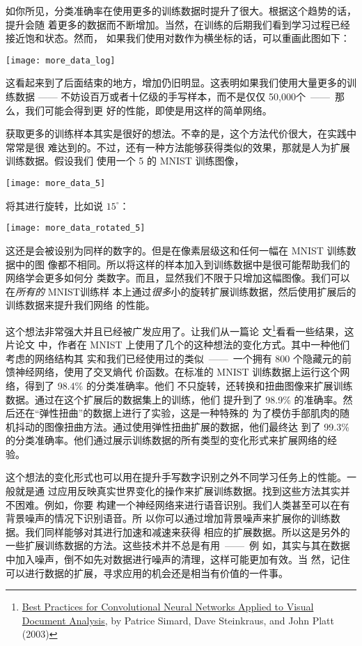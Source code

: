 如你所见，分类准确率在使用更多的训练数据时提升了很大。根据这个趋势的话，提升会随
着更多的数据而不断增加。当然，在训练的后期我们看到学习过程已经接近饱和状态。然而，
如果我们使用对数作为横坐标的话，可以重画此图如下：
\begin{center}
\texttt{[image: more\_data\_log]}
\end{center}

这看起来到了后面结束的地方，增加仍旧明显。这表明如果我们使用大量更多的训练数据
—— 不妨设百万或者十亿级的手写样本，而不是仅仅 50,000个~——~那么，我们可能会得到更
好的性能，即使是用这样的简单网络。

获取更多的训练样本其实是很好的想法。不幸的是，这个方法代价很大，在实践中常常是很
难达到的。不过，还有一种方法能够获得类似的效果，那就是人为扩展训练数据。假设我们
使用一个 5 的 MNIST 训练图像，
\begin{center}
  \texttt{[image: more\_data\_5]}
\end{center}
将其进行旋转，比如说 $15^{\circ}$：
\begin{center}
  \texttt{[image: more\_data\_rotated\_5]}
\end{center}

这还是会被设别为同样的数字的。但是在像素层级这和任何一幅在 MNIST 训练数据中的图
像都不相同。所以将这样的样本加入到训练数据中是很可能帮助我们的网络学会更多如何分
类数字。而且，显然我们不限于只增加这幅图像。我们可以在\emph{所有的} MNIST训练样
本上通过\emph{很多}小的旋转扩展训练数据，然后使用扩展后的训练数据来提升我们网络
的性能。

这个想法非常强大并且已经被广发应用了。让我们从一篇论
文\footnote{\href{http://dx.doi.org/10.1109/ICDAR.2003.1227801}{Best Practices
    for Convolutional Neural Networks Applied to Visual Document Analysis}, by
  Patrice Simard, Dave Steinkraus, and John Platt (2003)}看看一些结果，这片论文
中，作者在 MNIST 上使用了几个的这种想法的变化方式。其中一种他们考虑的网络结构其
实和我们已经使用过的类似~——~一个拥有 800 个隐藏元的前馈神经网络，使用了交叉熵代
价函数。在标准的 MNIST 训练数据上运行这个网络，得到了 98.4\% 的分类准确率。他们
不只旋转，还转换和扭曲图像来扩展训练数据。通过在这个扩展后的数据集上的训练，他们
提升到了 98.9\% 的准确率。然后还在“弹性扭曲”的数据上进行了实验，这是一种特殊的
为了模仿手部肌肉的随机抖动的图像扭曲方法。通过使用弹性扭曲扩展的数据，他们最终达
到了 99.3\% 的分类准确率。他们通过展示训练数据的所有类型的变化形式来扩展网络的经
验。

这个想法的变化形式也可以用在提升手写数字识别之外不同学习任务上的性能。一般就是通
过应用反映真实世界变化的操作来扩展训练数据。找到这些方法其实并不困难。例如，你要
构建一个神经网络来进行语音识别。我们人类甚至可以在有背景噪声的情况下识别语音。所
以你可以通过增加背景噪声来扩展你的训练数据。我们同样能够对其进行加速和减速来获得
相应的扩展数据。所以这是另外的一些扩展训练数据的方法。这些技术并不总是有用~——~例
如，其实与其在数据中加入噪声，倒不如先对数据进行噪声的清理，这样可能更加有效。当
然，记住可以进行数据的扩展，寻求应用的机会还是相当有价值的一件事。

